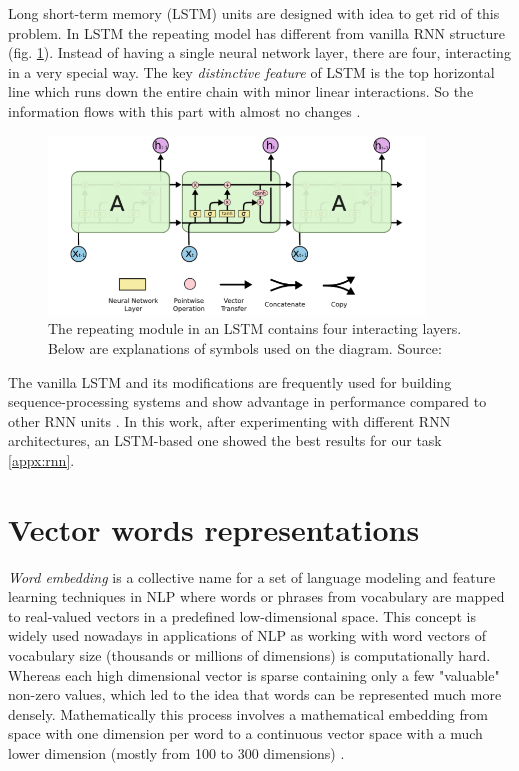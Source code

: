 Long short-term memory (LSTM) units are designed with idea to get rid of this problem. In LSTM the repeating model has different from vanilla RNN structure (fig. \ref{fig:lstm}). Instead of having a single neural network layer, there are four, interacting in a very special way. The key \textit{distinctive feature} of LSTM is the top horizontal line which runs down the entire chain with minor linear interactions. So the information flows with this part with almost no changes \citep{Olah-2015}.

\begin{figure}[h]
    \centering
    \includegraphics[width=10cm]{Images/lstm.png}
    \caption{The repeating module in an LSTM contains four interacting layers. Below are explanations of symbols used on the diagram. Source: \citep{Olah-2015}}
    \label{fig:lstm}
\end{figure} 

The vanilla LSTM and its modifications are frequently used for building sequence-processing systems and show advantage in performance compared to other RNN units \citep{Hochreiter-1997}.
In this work, after experimenting with different RNN architectures, an LSTM-based one showed the best results for our task \ref{appx:rnn}. 

\section{Vector words representations}

\textit{Word embedding} is a collective name for a set of language modeling and feature learning techniques in NLP where words or phrases from vocabulary are mapped to real-valued vectors in a predefined low-dimensional space. This concept is widely used nowadays in applications of NLP as working with word vectors of vocabulary size (thousands or millions of dimensions) is computationally hard. Whereas each high dimensional vector is sparse containing only a few "valuable" non-zero values, which led to the idea that words can be represented much more densely. Mathematically this process involves a mathematical embedding from space with one dimension per word to a continuous vector space with a much lower dimension (mostly from 100 to 300 dimensions) \citep{Brownlee-2017}.

